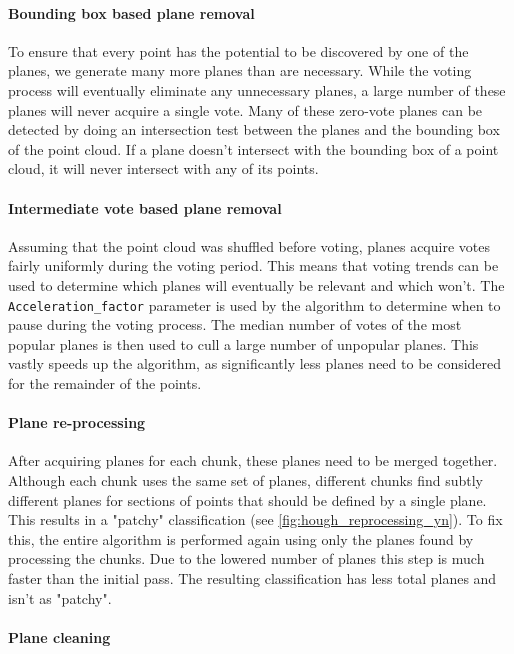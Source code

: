 \documentclass[a4paper,9pt]{article}
\begin{document}
\paragraph{Bounding box based plane removal}

To ensure that every point has the potential to be discovered by one of the planes, we generate many more planes than are necessary. While the voting process will eventually eliminate any unnecessary planes, a large number of these planes will never acquire a single vote. Many of these zero-vote planes can be detected by doing an intersection test between the planes and the bounding box of the point cloud. If a plane doesn't intersect with the bounding box of a point cloud, it will never intersect with any of its points.

\paragraph{Intermediate vote based plane removal}

Assuming that the point cloud was shuffled before voting, planes acquire votes fairly uniformly during the voting period. This means that voting trends can be used to determine which planes will eventually be relevant and which won't. The \verb|Acceleration_factor| parameter is used by the algorithm to determine when to pause during the voting process. The median number of votes of the most popular planes is then used to cull a large number of unpopular planes. This vastly speeds up the algorithm, as significantly less planes need to be considered for the remainder of the points.

\paragraph{Plane re-processing}

After acquiring planes for each chunk, these planes need to be merged together. Although each chunk uses the same set of planes, different chunks find subtly different planes for sections of points that should be defined by a single plane. This results in a "patchy" classification (see \ref{fig:hough_reprocessing_yn}). To fix this, the entire algorithm is performed again using only the planes found by processing the chunks. Due to the lowered number of planes this step is much faster than the initial pass. The resulting classification has less total planes and isn't as "patchy".

\paragraph{Plane cleaning}
\end{document}
